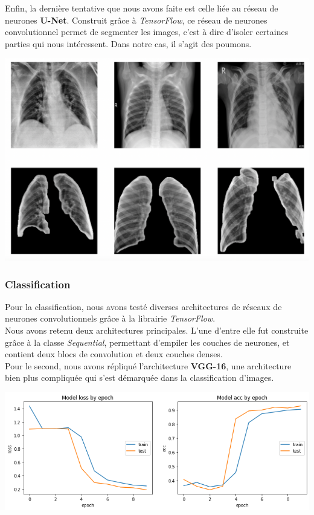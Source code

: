 \documentclass{article}
\begin{document}
	Enfin, la dernière tentative que nous avons faite est celle liée au réseau de neurones \textbf{U-Net}. Construit grâce à \textit{TensorFlow}, ce réseau de neurones convolutionnel permet de segmenter les images, c'est à dire d'isoler certaines parties qui nous intéressent. Dans notre cas, il s'agit des poumons.
	
	\begin{center}
	\includegraphics[scale=0.6]{unet.png}
	\end{center}
	
	\subsubsection*{Classification}

	Pour la classification, nous avons testé diverses architectures de réseaux de neurones convolutionnels grâce à la librairie \textit{TensorFlow}.\\
	Nous avons retenu deux architectures principales. L'une d'entre elle fut construite grâce à la classe \textit{Sequential}, permettant d'empiler les couches de neurones, et contient deux blocs de convolution et deux couches denses.\\
	Pour le second, nous avons répliqué l'architecture \textbf{VGG-16}, une architecture bien plus compliquée qui s'est démarquée dans la classification d'images.
	
	\begin{center}
	\includegraphics[scale=0.5]{acc_vgg_zb.png}
	\end{center}
	
\end{document}
